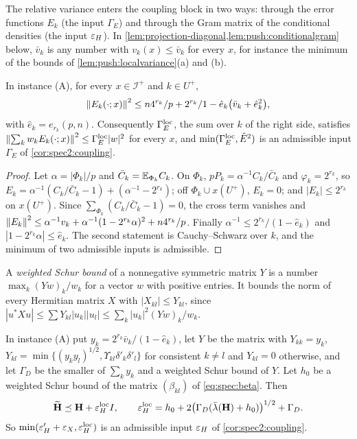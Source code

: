 The relative variance enters the coupling block in two ways: through the
error functions $E_k$ (the input $\Gamma_E$) and through the Gram matrix of the
conditional densities (the input $\varepsilon_H$). In \cref{lem:projection-diagonal,lem:push:conditionalgram} below, $\bar v_k$ is any
number with $v_k(x)\le\bar v_k$ for every $x$, for instance the minimum of the
bounds of \cref{lem:push:localvariance}(a) and (b).

\begin{lemma}\label{lem:projection-diagonal}
In instance \textup{(A)}, for every $x\in\mathcal I^+$ and $k\in U^+$,
\begin{equation}\label{eq:push:projectiondiagonal}
  \left\|E_k(\cdot;x)\right\|^2\le n4^{r_k}/p+2^{r_k}/1-\hat e_k\big(\bar v_k+\hat e_k^2\big),
\end{equation}
with $\hat e_k=e_{r_k}(p,n)$. Consequently $\Gamma^{\rm loc}_E$, the sum over $k$ of the
right side, satisfies $\left\|\sum_kw_kE_k(\cdot;x)\right\|^2\le\Gamma^{\rm loc}_E|w|^2$ for every
$x$, and $\min(\Gamma^{\rm loc}_E,\hat E^2)$ is an admissible input $\Gamma_E$ of
\cref{cor:spec2:coupling}.
\end{lemma}

\begin{proof}
Let $\alpha=|\Phi_k|/p$ and $\bar C_k=\mathbb E_{\Phi_k}C_k$. On $\Phi_k$,
$pP_k=\alpha^{-1}C_k/\bar C_k$ and $\varphi_k=2^{r_k}$, so
$E_k=\alpha^{-1}(C_k/\bar C_k-1)+(\alpha^{-1}-2^{r_k})$; off $\Phi_k\cup x(U^+)$, $E_k=0$; and
$|E_k|\le2^{r_k}$ on $x(U^+)$. Since $\sum_{\Phi_k}(C_k/\bar C_k-1)=0$, the cross term
vanishes and
$\left\|E_k\right\|^2\le\alpha^{-1}v_k+\alpha^{-1}(1-2^{r_k}\alpha)^2+n4^{r_k}/p$. Finally
$\alpha^{-1}\le2^{r_k}/(1-\hat e_k)$ and $|1-2^{r_k}\alpha|\le\hat e_k$. The second statement
is Cauchy--Schwarz over $k$, and the minimum of two admissible inputs is
admissible.
\end{proof}

A \emph{weighted Schur bound} of a nonnegative symmetric matrix $Y$ is a number
$\max_k(Yw)_k/w_k$ for a vector $w$ with positive entries. It bounds the norm of
every Hermitian matrix $X$ with $|X_{kl}|\le Y_{kl}$, since
$|u^*Xu|\le\sum Y_{kl}|u_k||u_l|\le\sum_k|u_k|^2(Yw)_k/w_k$.

\begin{lemma}\label{lem:push:conditionalgram}
In instance \textup{(A)} put $y_k=2^{r_k}\bar v_k/(1-\hat e_k)$, let $Y$ be the matrix with
$Y_{kk}=y_k$, $Y_{kl}=\min\{(y_ky_l)^{1/2},\Upsilon_{kl}\delta'_k\delta'_l\}$ for consistent
$k\ne l$ and $Y_{kl}=0$ otherwise, and let $\Gamma_D$ be the smaller of $\sum_ky_k$ and a
weighted Schur bound of $Y$. Let $h_0$ be a weighted Schur bound of the matrix
$(\beta_{kl})$ of \eqref{eq:spec:beta}. Then
\begin{equation}\label{eq:push:conditionalgram}
  \widetilde{\mathbf H}\preceq\mathbf H+\varepsilon^{\rm loc}_HI,\qquad
  \varepsilon^{\rm loc}_H=h_0+2\big(\Gamma_D(\bar\lambda(\mathbf H)+h_0)\big)^{1/2}+\Gamma_D .
\end{equation}
So $\min(\varepsilon'_H+\varepsilon_X,\varepsilon^{\rm loc}_H)$ is an admissible input $\varepsilon_H$ of
\cref{cor:spec2:coupling}.
\end{lemma}

